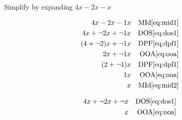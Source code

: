 \documentclass[20150903-160354-rs2.2-MarksMathNotebook.tex]{subfiles}
\begin{document}
\begin{example}[id:20141106-152020] \label{20141106-152020}  \hfill \\

Simplify by expanding $4x-2x-x$

\soln

\solnsteps
\begin{align*}
4x-2x-1x && \text{MId} \eqref{eq:mid1} \\
4x+\neg 2x + \neg 1 x && \text{DOS} \eqref{eq:dos1} \\
(4+\neg 2)x + \neg 1x && \text{DPF} \eqref{eq:dpf1} \\
2x+\neg 1x && \text{OOA} \eqref{eq:ooa} \\
(2+\neg 1)x && \text{DPF} \eqref{eq:dpf1} \\
1x && \text{OOA} \eqref{eq:ooa} \\
x && \text{MId} \eqref{eq:mid2}
\end{align*}

\soln

\lesssteps
\begin{align*}
4x + \neg 2x + \neg x && \text{DOS} \eqref{eq:dos1} \\
x && \text{OOA} \eqref{eq:ooa}
\end{align*}
\end{example}
\end{document}
